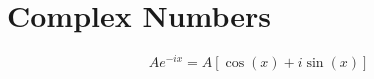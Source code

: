 \section{Complex Numbers}
	\begin{equation} \label{eq:Exponential to Rectangular}
		A e^{-ix} = A \left[ \cos \left( x \right) + i\sin \left( x \right) \right]
	\end{equation}